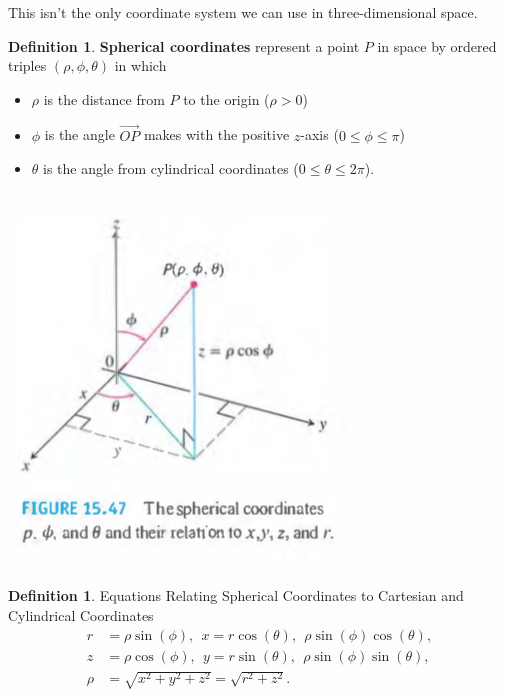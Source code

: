 \documentclass[12pt, letter]{article}
\theoremstyle{plain}
\numberwithin{theorem}{section}
\theoremstyle{definition}
\newtheorem{definition}[theorem]{Definition}
\begin{document}
\bigskip

\hrulefill

\bigskip

This isn't the only coordinate system we can use in three-dimensional space.

\bigskip

\begin{definition}
\textbf{Spherical coordinates} represent a point $P$ in space by ordered triples $(\rho, \phi,\theta)$ in which
\begin{itemize}
\item[1.] $\rho$ is the distance from $P$ to the origin ($\rho>0$)
\item[2.] $\phi$ is the angle $\vec{OP}$ makes with the positive $z$-axis ($0\leq \phi \leq \pi$)
\item[3.] $\theta$ is the angle from cylindrical coordinates ($0\leq \theta \leq 2\pi$).
\end{itemize}
\end{definition}

\bigskip

\begin{center}
\includegraphics[scale=0.7]{m3_f21}
\end{center}

\bigskip

\hrulefill

\bigskip

\begin{definition}{Equations Relating Spherical Coordinates to Cartesian and Cylindrical Coordinates}
\begin{align*}
r&=\rho\sin(\phi), \ \ x=r\cos(\theta), \ \ \rho\sin(\phi)\cos(\theta),\\
z&=\rho\cos(\phi), \ \ y=r\sin(\theta), \ \ \rho\sin(\phi)\sin(\theta),\\
\rho &= \sqrt{x^2+y^2+z^2} = \sqrt{r^2+z^2}.
\end{align*}
\end{definition}
\end{document}
